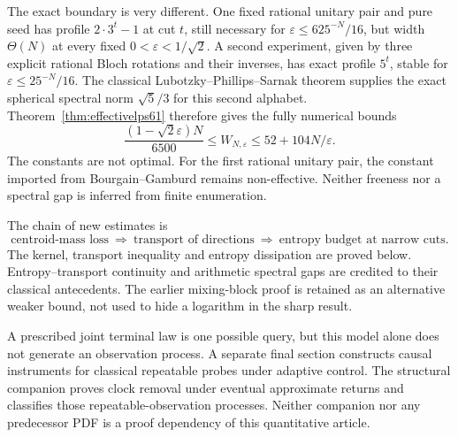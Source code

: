 The exact boundary is very different. One fixed rational unitary pair
and pure seed has profile $2\cdot3^t-1$ at cut $t$, still necessary for
$\varepsilon\le625^{-N}/16$, but width $\Theta(N)$ at every fixed
$0<\varepsilon<1/\sqrt2$. A second experiment, given by three explicit
rational Bloch rotations and their inverses, has exact profile $5^t$,
stable for $\varepsilon\le25^{-N}/16$. The classical
Lubotzky--Phillips--Sarnak theorem supplies the exact spherical spectral
norm $\sqrt5/3$ for this second alphabet. Theorem~\ref{thm:effectivelps61}
therefore gives the fully numerical bounds
\[
 \frac{(1-\sqrt2\varepsilon)N}{6500}
 \le W_{N,\varepsilon}\le52+104N/\varepsilon.
\]
The constants are not optimal. For the first rational unitary pair, the
constant imported from Bourgain--Gamburd remains non-effective. Neither
freeness nor a spectral gap is inferred from finite enumeration.

The chain of new estimates is
\[
 \text{centroid-mass loss}\ \Longrightarrow\
 \text{transport of directions}\ \Longrightarrow\
 \text{entropy budget at narrow cuts}.
\]
The kernel, transport inequality and entropy dissipation are proved
below. Entropy--transport continuity and arithmetic spectral gaps are
credited to their classical antecedents. The earlier mixing-block proof
is retained as an alternative weaker bound, not used to hide a
logarithm in the sharp result.

A prescribed joint terminal law is one possible query, but this model
alone does not generate an observation process. A separate final section
constructs causal instruments for classical repeatable probes under
adaptive control. The structural companion proves clock removal under
eventual approximate returns and classifies those repeatable-observation
processes. Neither companion nor any predecessor PDF is a proof
dependency of this quantitative article.

